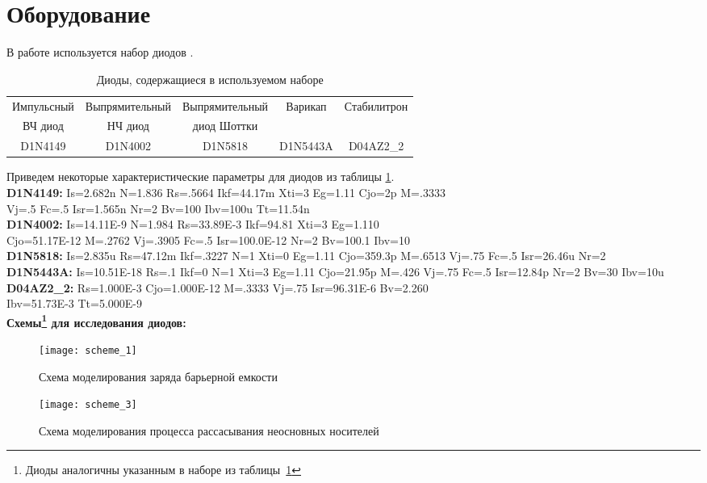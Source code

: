 \documentclass{semi}
\begin{document}

\section*{Оборудование}

В работе используется набор диодов .

\begin{table}[H]
	\centering
	\begin{tabular}{|ccccc|}
		\hline
		Импульсный	&Выпрямительный	&Выпрямительный	&Варикап	&Стабилитрон\\
		ВЧ диод		&НЧ диод		&диод Шоттки	&			&			\\ \hline
		D1N4149		&D1N4002		&D1N5818		&D1N5443A	&D04AZ2\_2	\\ \hline 
	\end{tabular}
	\caption{Диоды, содержащиеся в используемом наборе}
	\label{tab:diodes}
\end{table}

Приведем некоторые характеристические параметры для диодов из таблицы \ref{tab:diodes}.\\

\textbf{{\normalsize D1N4149:}}
Is=2.682n N=1.836 Rs=.5664 Ikf=44.17m Xti=3 Eg=1.11 Cjo=2p
M=.3333\\ Vj=.5 Fc=.5 Isr=1.565n Nr=2 Bv=100 Ibv=100u Tt=11.54n\\

\textbf{{\normalsize D1N4002:}}
Is=14.11E-9 N=1.984 Rs=33.89E-3 Ikf=94.81 Xti=3
Eg=1.110\\ Cjo=51.17E-12 M=.2762 Vj=.3905 Fc=.5 Isr=100.0E-12
Nr=2 Bv=100.1 Ibv=10\\

\textbf{{\normalsize D1N5818:}}
Is=2.835u Rs=47.12m Ikf=.3227 N=1 Xti=0 Eg=1.11 Cjo=359.3p
M=.6513 Vj=.75 Fc=.5 Isr=26.46u Nr=2\\

\textbf{{\normalsize D1N5443A:}}
Is=10.51E-18 Rs=.1 Ikf=0 N=1 Xti=3 Eg=1.11 Cjo=21.95p
M=.426 Vj=.75 Fc=.5 Isr=12.84p Nr=2 Bv=30 Ibv=10u\\

\textbf{{\normalsize D04AZ2\_2:}}
Rs=1.000E-3 Cjo=1.000E-12 M=.3333 Vj=.75 Isr=96.31E-6
Bv=2.260\\ Ibv=51.73E-3 Tt=5.000E-9\\

\textbf{{\normalsize Схемы\footnote{Диоды аналогичны указанным в наборе из таблицы~\ref{tab:diodes}} для исследования диодов:}}
\begin{figure}[H]
	\centering
	\texttt{[image: scheme\_1]}
	\caption{\footnotesize Схема моделирования заряда барьерной емкости}
	\label{scheme_1}
	\texttt{[image: scheme\_3]}
	\caption{\footnotesize Схема моделирования процесса рассасывания неосновных носителей}
	\label{scheme_3}
\end{figure}
\end{document}
